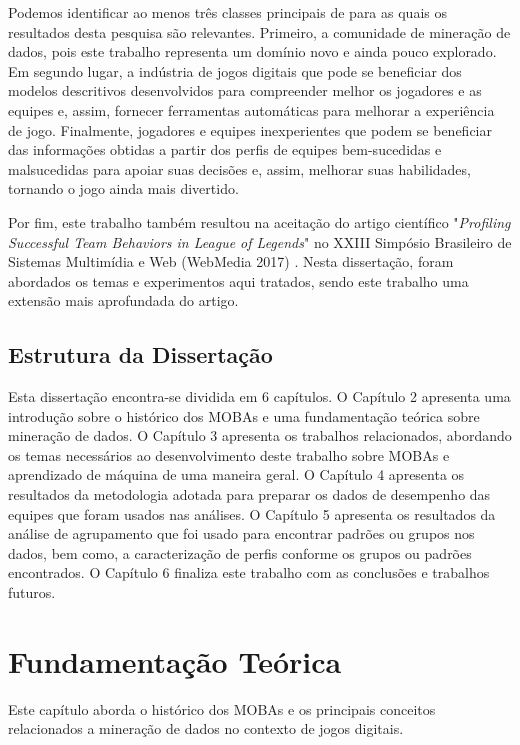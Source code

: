 Podemos identificar ao menos três classes principais de \textit{} para as quais os resultados desta pesquisa são relevantes. Primeiro, a comunidade de mineração de dados, pois este trabalho representa um domínio novo e ainda pouco explorado. Em segundo lugar, a indústria de jogos digitais que pode se beneficiar dos modelos descritivos  desenvolvidos para compreender melhor os jogadores e as equipes e, assim, fornecer ferramentas automáticas para melhorar a experiência de jogo. Finalmente, jogadores e equipes inexperientes que podem se beneficiar das informações obtidas a partir dos perfis de equipes bem-sucedidas e malsucedidas para apoiar suas decisões e, assim, melhorar suas habilidades, tornando o jogo ainda mais divertido.

Por fim, este trabalho também resultou na aceitação do artigo científico "\textit{Profiling Successful Team Behaviors in League of Legends}" no XXIII Simpósio Brasileiro de Sistemas Multimídia e Web (WebMedia 2017) . Nesta disserta\c{c}\~{a}o, foram abordados os temas e experimentos aqui tratados, sendo este trabalho uma extensão mais aprofundada do artigo.

\section{Estrutura da Dissertação}
Esta dissertação encontra-se dividida em 6 capítulos. O Capítulo 2 apresenta uma introdução sobre o histórico dos MOBAs e uma fundamentação teórica sobre mineração de dados. O Capítulo 3 apresenta os trabalhos relacionados, abordando os temas necessários ao desenvolvimento deste trabalho sobre MOBAs e aprendizado de máquina de uma maneira geral. O Capítulo 4 apresenta os resultados da metodologia adotada para preparar os dados de desempenho das equipes que foram usados nas análises. O Capítulo 5 apresenta os resultados da análise de agrupamento que foi usado para encontrar padrões ou grupos nos dados, bem como, a caracterização de perfis conforme os grupos ou padrões encontrados. O Capítulo 6 finaliza este trabalho com as conclusões e trabalhos futuros.

\chapter{Fundamentação Teórica}

Este capítulo aborda o histórico dos MOBAs e os principais conceitos relacionados a mineração de dados no contexto de jogos digitais.

